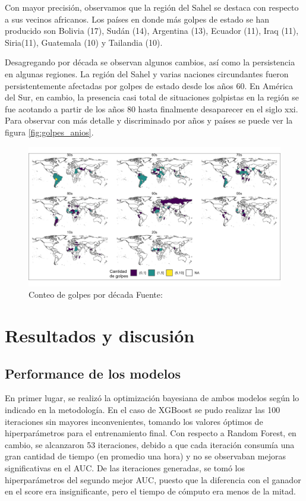 \documentclass{article}
\begin{document}
Con mayor precisión, observamos que la región del Sahel se destaca con respecto a sus
vecinos africanos. Los países en donde más golpes de estado se han producido son
Bolivia (17), Sudán (14), Argentina (13), Ecuador (11), Iraq (11), Siria(11), 
Guatemala (10) y Tailandia (10).

Desagregando por década se observan algunos cambios, así como la persistencia en 
algunas regiones. La región del Sahel y varias naciones circundantes fueron 
persistentemente afectadas por golpes de estado desde los años 60. En América del 
Sur, en cambio, la presencia casi total de situaciones golpistas en la región se 
fue acotando a partir de los años 80 hasta finalmente desaparecer en el siglo 
xxi. Para observar con más detalle y discriminado por años y países se puede ver 
la figura \ref{fig:golpes_anios}.

\begin{figure}[H]
  \centering  
  \includegraphics[width=1\textwidth]{3_golpes_decadas.png}
  \caption{Conteo de golpes por década Fuente:\cite{Pow11} \label{fig:golpes_decadas}}
\end{figure}

\section{Resultados y discusión}

\subsection{Performance de los modelos}
En primer lugar, se realizó la optimización bayesiana de ambos modelos según lo indicado
en la metodología. En el caso de XGBoost se pudo realizar las 100 iteraciones sin mayores
inconvenientes, tomando los valores óptimos de hiperparámetros para el entrenamiento 
final. Con respecto a Random Forest, en cambio, se alcanzaron 53 iteraciones, debido a que cada
iteración consumía una gran cantidad de tiempo (en promedio una hora) y no se observaban
mejoras significativas en el AUC. De las iteraciones generadas, se tomó los 
hiperparámetros del segundo mejor AUC, puesto que la diferencia con el ganador en el score 
era insignificante, pero el tiempo de cómputo era menos de la mitad.
\end{document}
